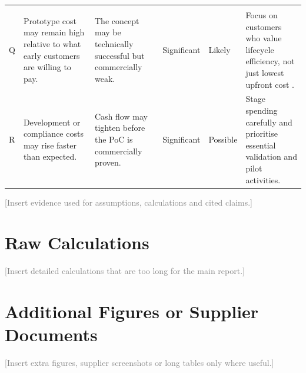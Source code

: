 \documentclass[11pt,a4paper]{article}
\newcommand{\placeholder}[1]{\textcolor{gray}{#1}}
\begin{document}
\begin{longtable}{L{0.8cm}L{3.5cm}L{3.2cm}L{1.3cm}L{1.4cm}L{3.8cm}}
\addlinespace
{} \\
Q & Prototype cost may remain high relative to what early customers are willing to pay. & The concept may be technically successful but commercially weak. & Significant & Likely & Focus on customers who value lifecycle efficiency, not just lowest upfront cost \cite{ref6,ref4}. \\
R & Development or compliance costs may rise faster than expected. & Cash flow may tighten before the PoC is commercially proven. & Significant & Possible & Stage spending carefully and prioritise essential validation and pilot activities. \\

\end{longtable}
\normalsize
\placeholder{[Insert evidence used for assumptions, calculations and cited claims.]}

\section{Raw Calculations}
\placeholder{[Insert detailed calculations that are too long for the main report.]}

\section{Additional Figures or Supplier Documents}
\placeholder{[Insert extra figures, supplier screenshots or long tables only where useful.]}
\end{document}
